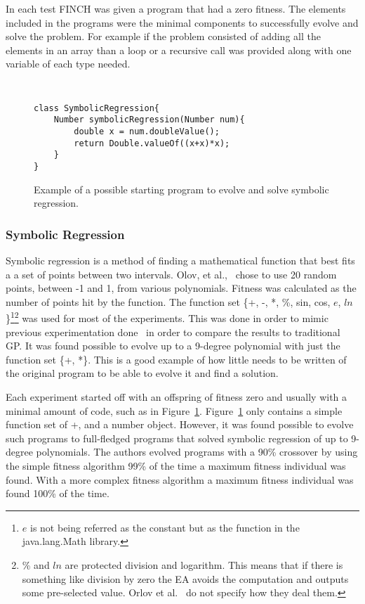 \documentclass{sig-alternate}
\begin{document}
In each test FINCH was given a program that had a zero fitness. The elements included in the programs were the minimal components to successfully evolve and solve the problem. For example if the problem consisted of adding all the elements in an array than a loop or a recursive call was provided along with one variable of each type needed.

\begin{figure}
\centering
{\tt
\begin{verbatim}
class SymbolicRegression{
    Number symbolicRegression(Number num){
        double x = num.doubleValue();
        return Double.valueOf((x+x)*x);
    }
}
\end{verbatim}
}
\caption{Example of a possible starting program to evolve and solve symbolic regression.}
\label{regression}
\end{figure}
\subsubsection{Symbolic Regression}
Symbolic regression is a method of finding a mathematical function that best fits a a set of points between two intervals. Olov, et al.,~\cite{FINCH:2011} chose to use 20 random points, between -1 and 1, from various polynomials. Fitness was calculated as the number of points hit by the function. The function set \{+, -, *, \%, sin, cos, $e$, $ln$\}\footnote{$e$ is not being referred as the constant but as the function in the java.lang.Math library.}\footnote{\% and $ln$ are protected division and logarithm. This means that if there is something like division by zero the EA avoids the computation and outputs some pre-selected value. Orlov et al.~\cite{FINCH:2011} do not specify how they deal them.} was used for most of the experiments. This was done in order to mimic previous experimentation done~\cite{koza:1992} in order to compare the results to traditional GP. It was found possible to evolve up to a 9-degree polynomial with just the function set \{+, *\}. This is a good example of how little needs to be written of the original program to be able to evolve it and find a solution.

Each experiment started off with an offspring of fitness zero and usually with a minimal amount of code, such as in Figure~\ref{regression}. Figure~\ref{regression} only contains a simple function set of {+, \*} and a number object. However, it was found possible  to evolve such programs to full-fledged programs that solved symbolic regression of up to 9-degree polynomials. 
The authors evolved programs with a 90\% crossover by using the simple fitness algorithm 99\% of the time a maximum fitness individual was found. With a more complex fitness algorithm a maximum fitness individual was found 100\% of the time.
\end{document}
